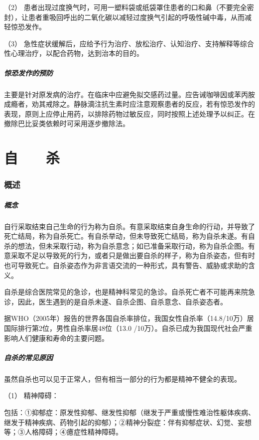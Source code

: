 （2）
患者出现过度换气时，可用一塑料袋或纸袋罩住患者的口和鼻（不要完全密封），让患者重吸回呼出的二氧化碳以减轻过度换气引起的呼吸性碱中毒，从而减轻惊恐发作。

（3）
急性症状缓解后，应给予行为治疗、放松治疗、认知治疗、支持解释等综合性心理治疗，以配合药物，达到治本的目的。

\subparagraph{惊恐发作的预防}

主要是针对原发病的治疗。在临床中应避免拟交感药过量。应告诫咖啡因或苯丙胺成瘾者，劝其戒除之。静脉滴注抗生素时应注意观察患者的反应，若有惊恐发作的表现，原则上应停止用药，以排除药物过敏反应，同时按照上述处理予以纠正。在撤除巴比妥类依赖时可采用逐步撤除法。

\protect\hypertarget{text00052.html}{}{}

\section{自　　杀}

\subsubsection{概述}

\subparagraph{概念}

自行采取结束自己生命的行为称为自杀。有意采取结束自身生命的行动，并导致了死亡结局，称为自杀死亡。有自杀举动，但未导致死亡结局，称为自杀未遂。有自杀的想法，但未采取行动，称为自杀意念；如已准备采取行动，称为自杀企图。有意采取不足以导致死的行为，或者只是做出要自杀的样子，称为自杀姿态，但有时也可导致死亡。自杀姿态作为非言语交流的一种形式，具有警告、威胁或求助的含义。

自杀是综合医院常见的急诊，也是精神科常见的急诊。自杀死亡者不可能再来院急诊，因此，医生遇到的是自杀未遂、自杀企图、自杀意念、自杀姿态者。

据WHO（2005年）报告的世界各国自杀率排位，我国女性自杀率（14.8/10万）居国际排行第2位，男性自杀率居48位（13.0
/10万）。自杀已成为我国现代社会严重影响人们健康和寿命的主要问题。

\subparagraph{自杀的常见原因}

虽然自杀也可以见于正常人，但有相当一部分的行为都是精神不健全的表现。

\hypertarget{text00052.htmlux5cux23CHP1-18-10-1-2-1}{}
（1） 精神障碍：

包括：①抑郁症：原发性抑郁、继发性抑郁（继发于严重或慢性难治性躯体疾病、继发于精神疾病、药物引起的抑郁）；②精神分裂症：伴有抑郁症状、幻觉、妄想等；③人格障碍；④癔症性精神障碍。

